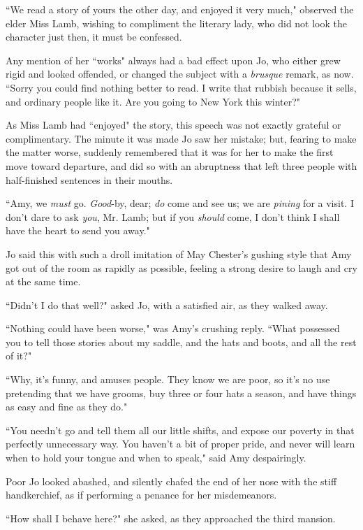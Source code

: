 ``We read a story of yours the other day, and enjoyed it very much,"
observed the elder Miss Lamb, wishing to compliment the literary lady,
who did not look the character just then, it must be confessed.

Any mention of her ``works" always had a bad effect upon Jo, who either
grew rigid and looked offended, or changed the subject with a
\emph{brusque} remark, as now. ``Sorry you could find nothing better to
read. I write that rubbish because it sells, and ordinary people like
it. Are you going to New York this winter?"

As Miss Lamb had ``enjoyed" the story, this speech was not exactly
grateful or complimentary. The minute it was made Jo saw her mistake;
but, fearing to make the matter worse, suddenly remembered that it was
for her to make the first move toward departure, and did so with an
abruptness that left three people with half-finished sentences in their
mouths.

``Amy, we \emph{must} go. \emph{Good}-by, dear; \emph{do} come and see
us; we are \emph{pining} for a visit. I don't dare to
ask \emph{you}, Mr. Lamb; but if you \emph{should} come, I
don't think I shall have the heart to send you away."

Jo said this with such a droll imitation of May
Chester's gushing style that Amy got out of the room as
rapidly as possible, feeling a strong desire to laugh and cry at the
same time.

``Didn't I do that well?" asked Jo, with a satisfied air,
as they walked away.

``Nothing could have been worse," was Amy's crushing
reply. ``What possessed you to tell those stories about my saddle, and
the hats and boots, and all the rest of it?"

``Why, it's funny, and amuses people. They know we are
poor, so it's no use pretending that we have grooms, buy
three or four hats a season, and have things as easy and fine as they
do."

``You needn't go and tell them all our little shifts, and
expose our poverty in that perfectly unnecessary way. You
haven't a bit of proper pride, and never will learn when
to hold your tongue and when to speak," said Amy despairingly.

Poor Jo looked abashed, and silently chafed the end of her nose with the
stiff handkerchief, as if performing a penance for her misdemeanors.

``How shall I behave here?" she asked, as they approached the third
mansion.

